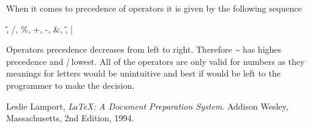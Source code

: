 \documentclass[a4wide, 11pt]{article}
\begin{document}
When it comes to precedence of operators it is given by the following sequence

\begin{center} \~, /, \%, +, -, \&, \^, | \end{center}

Operators precedence decreases from left to right. Therefore \emph{\~} has highes precedence and \emph{|} lowest.
All of the operators are only valid for numbers as they meanings for letters would be unintuitive and best if would be left to the programmer to make the decision.


\begin{thebibliography}{9}

  Leslie Lamport,
  \emph{\LaTeX: A Document Preparation System}.
  Addison Wesley, Massachusetts,
  2nd Edition,
  1994.

\end{thebibliography}
\end{document}
